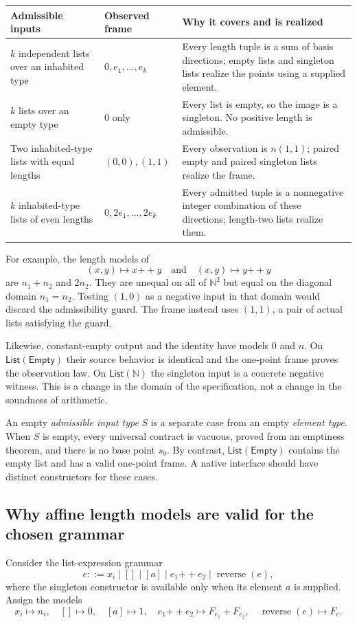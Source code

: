 \documentclass[11pt,letterpaper]{article}
\newcommand{\N}{\mathbb N}\newcommand{\Z}{\mathbb Z}\newcommand{\Q}{\mathbb Q}\newcommand{\R}{\mathbb R}
\theoremstyle{definition}\newtheorem{definition}[theorem]{Definition}
\theoremstyle{remark}\newtheorem{remark}[theorem]{Remark}
\begin{document}
\begin{center}\small
\begin{tabularx}{\textwidth}{@{}P{0.24\textwidth}P{0.27\textwidth}Y@{}}
\toprule Admissible inputs & Observed frame & Why it covers and is realized\\\midrule
$k$ independent lists over an inhabited type & $0,e_1,\ldots,e_k$ & Every length
tuple is a sum of basis directions; empty lists and singleton lists realize the
points using a supplied element.\\
$k$ lists over an empty type & $0$ only & Every list is empty, so the image is a
singleton. No positive length is admissible.\\
Two inhabited-type lists with equal lengths & $(0,0),(1,1)$ & Every observation
is $n(1,1)$; paired empty and paired singleton lists realize the frame.\\
$k$ inhabited-type lists of even lengths & $0,2e_1,\ldots,2e_k$ & Every admitted
tuple is a nonnegative integer combination of these directions; length-two
lists realize them.\\
\bottomrule
\end{tabularx}
\end{center}

For example, the length models of
\[
 (x,y)\longmapsto x\mathbin{+\!+}y
 \quad\text{and}\quad
 (x,y)\longmapsto y\mathbin{+\!+}y
\]
are $n_1+n_2$ and $2n_2$. They are unequal on all of $\N^2$ but equal on the
diagonal domain $n_1=n_2$. Testing $(1,0)$ as a negative input in that domain
would discard the admissibility guard. The frame instead uses $(1,1)$, a pair
of actual lists satisfying the guard.

Likewise, constant-empty output and the identity have models $0$ and $n$.
On $\mathsf{List}(\mathsf{Empty})$ their source behavior is identical and the
one-point frame proves the observation law. On $\mathsf{List}(\N)$ the singleton
input is a concrete negative witness. This is a change in the domain of the
specification, not a change in the soundness of arithmetic.

An empty \emph{admissible input type} $S$ is a separate case from an empty
\emph{element type}. When $S$ is empty, every universal contract is vacuous,
proved from an emptiness theorem, and there is no base point $s_0$. By contrast,
$\mathsf{List}(\mathsf{Empty})$ contains the empty list and has a valid
one-point frame. A native interface should have distinct constructors for
these cases.

\subsection{Why affine length models are valid for the chosen grammar}
Consider the list-expression grammar
\[
 e::=x_i\mid []\mid [a]\mid e_1\mathbin{+\!+}e_2
       \mid\operatorname{reverse}(e),
\]
where the singleton constructor is available only when its element $a$ is
supplied. Assign the models
\[
 x_i\mapsto n_i,\quad []\mapsto0,\quad [a]\mapsto1,\quad
 e_1\mathbin{+\!+}e_2\mapsto F_{e_1}+F_{e_2},\quad
 \operatorname{reverse}(e)\mapsto F_e.
\]
\end{document}
